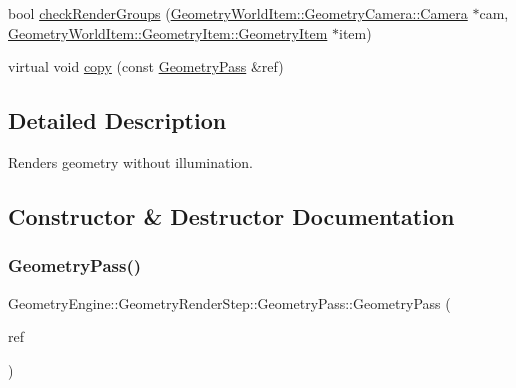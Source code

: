 \begin{DoxyCompactItemize}
\item 
bool \mbox{\hyperlink{class_geometry_engine_1_1_geometry_render_step_1_1_geometry_pass_af37e4ae472e97482eed93fc443438b2e}{check\+Render\+Groups}} (\mbox{\hyperlink{class_geometry_engine_1_1_geometry_world_item_1_1_geometry_camera_1_1_camera}{Geometry\+World\+Item\+::\+Geometry\+Camera\+::\+Camera}} $\ast$cam, \mbox{\hyperlink{class_geometry_engine_1_1_geometry_world_item_1_1_geometry_item_1_1_geometry_item}{Geometry\+World\+Item\+::\+Geometry\+Item\+::\+Geometry\+Item}} $\ast$item)
\item 
virtual void \mbox{\hyperlink{class_geometry_engine_1_1_geometry_render_step_1_1_geometry_pass_ae69b08dfd47ccfcc3888ca53511b660d}{copy}} (const \mbox{\hyperlink{class_geometry_engine_1_1_geometry_render_step_1_1_geometry_pass}{Geometry\+Pass}} \&ref)
\end{DoxyCompactItemize}


\subsection{Detailed Description}
Renders geometry without illumination. 

\subsection{Constructor \& Destructor Documentation}
\mbox{\label{class_geometry_engine_1_1_geometry_render_step_1_1_geometry_pass_a4c587bb12a23da23a1617824ccca402d}} 
\subsubsection{\texorpdfstring{GeometryPass()}{GeometryPass()}}
{\footnotesize\ttfamily Geometry\+Engine\+::\+Geometry\+Render\+Step\+::\+Geometry\+Pass\+::\+Geometry\+Pass (\begin{DoxyParamCaption}\item[{const \mbox{\hyperlink{class_geometry_engine_1_1_geometry_render_step_1_1_geometry_pass}{Geometry\+Pass}} \&}]{ref }\end{DoxyParamCaption})\hspace{0.3cm}{\ttfamily [inline]}}

